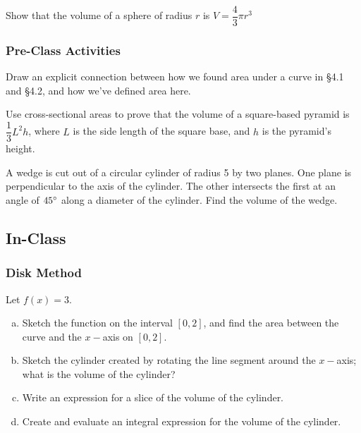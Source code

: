 \documentclass[notes]{subfiles}
\begin{document}
		\begin{ex}
			Show that the volume of a sphere of radius $r$ is $V = \dfrac{4}{3}\pi r^3$
		\end{ex}
			\newpage
	\subsubsection*{Pre-Class Activities}
		\begin{ex}
			Draw an explicit connection between how we found area under a curve in \S4.1 and \S4.2, and how we've defined area here.
		\end{ex}
			
		\begin{ex}
			Use cross-sectional areas to prove that the volume of a square-based pyramid is $\dfrac{1}{3}L^2h$, where $L$ is the side length of the square base, and $h$ is the pyramid's height.
		\end{ex}
			
		\begin{ex}
			A wedge is cut out of a circular cylinder of radius 5 by two planes.  One plane is perpendicular to the axis of the cylinder.  The other intersects the first at an angle of $45^\circ$ along a diameter of the cylinder.  Find the volume of the wedge.
		\end{ex}
			\newpage
			
	\subsection*{In-Class}
	\subsubsection*{Disk Method}
		\begin{ex}
			Let $f(x) = 3$.
			\begin{enumerate}[(a)]
				\item Sketch the function on the interval $[0,2]$, and find the area between the curve and the $x-$axis on $[0,2]$.
				\item Sketch the cylinder created by rotating the line segment around the $x-$axis; what is the volume of the cylinder?
					
				\item Write an expression for a slice of the volume of the cylinder.
					\newpage
					
				\item Create and evaluate an integral expression for the volume of the cylinder.
			\end{enumerate}
		\end{ex}
			
\end{document}
